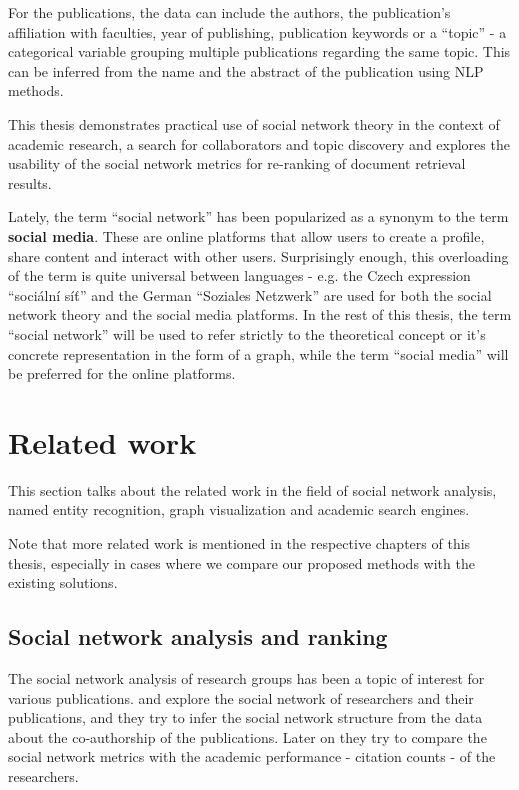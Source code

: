 For the publications, the data can include the authors, the publication's affiliation with faculties, year of publishing, publication keywords or a ``topic'' - a categorical variable grouping multiple publications regarding the same topic. This can be inferred from the name and the abstract of the publication using NLP methods.

This thesis demonstrates practical use of social network theory in the context of academic research, a search for collaborators and topic discovery and explores the usability of the social network metrics for re-ranking of document retrieval results.

Lately, the term ``social network'' has been popularized as a synonym to the term \textbf{social media}.
These are online platforms that allow users to create a profile, share content and interact with other users.
Surprisingly enough, this overloading of the term is quite universal between languages - e.g. the Czech expression ``sociální síť'' and the German ``Soziales Netzwerk'' are used for both the social network theory and the social media platforms.
In the rest of this thesis, the term ``social network'' will be used to refer strictly to the theoretical concept or it's concrete representation in the form of a graph, while the term ``social media'' will be preferred for the online platforms.

\section*{Related work}

This section talks about the related work in the field of social network analysis, named entity recognition, graph visualization and academic search engines.

Note that more related work is mentioned in the respective chapters of this thesis,
especially in cases where we compare our proposed methods with the existing solutions.

\subsection*{Social network analysis and ranking}

The social network analysis of research groups has been a topic of interest for various publications. 
\cite{ORDOOBADI2019S164} and \cite{CIMENLER2014667} explore the social network of researchers and their publications, and they try to infer the 
social network structure from the data about the co-authorship of the publications. 
Later on they try to compare the social network metrics with the academic performance - citation counts - of the researchers.

